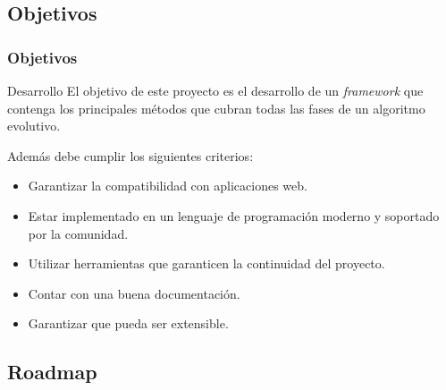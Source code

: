 \documentclass{beamer}
\begin{document}
\subsection{Objetivos}

\begin{frame}
\frametitle{Objetivos}

\begin{block}{Desarrollo}
 El objetivo de este proyecto es el desarrollo de un \textit{framework} que contenga los principales métodos que cubran todas las fases de un algoritmo evolutivo.
\end{block}

\bigskip

Además debe cumplir los siguientes criterios:

\begin{itemize}
    \item Garantizar la compatibilidad con aplicaciones web.
    \item Estar implementado en un lenguaje de programación moderno y soportado por la comunidad.
    \item Utilizar herramientas que garanticen la continuidad del proyecto.
    \item Contar con una buena documentación.
    \item Garantizar que pueda ser extensible.
\end{itemize}

\end{frame}

\subsection{Roadmap}
\end{document}
